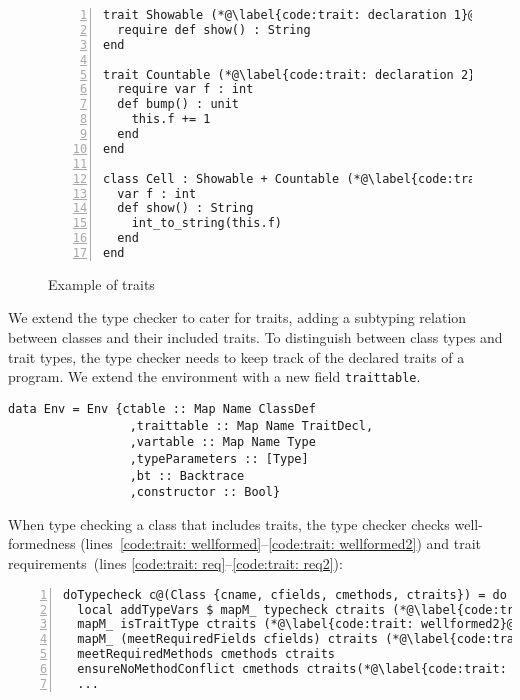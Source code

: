 \documentclass[sigplan,screen]{acmart}
\makeatletter
\newcommand{\ec}[1]{\lstinline[style=encore,breaklines=true,basicstyle=\fontsize{9}{9}\tt]@#1@}
\makeatother
\begin{document}
\begin{figure}[ht]
 \begin{lstlisting}[style=encore,xleftmargin=8ex,numbers=left]
trait Showable (*@\label{code:trait: declaration 1}@*)
  require def show() : String
end

trait Countable (*@\label{code:trait: declaration 2}@*)
  require var f : int
  def bump() : unit
    this.f += 1
  end
end

class Cell : Showable + Countable (*@\label{code:trait: instantiation trait}@*)
  var f : int
  def show() : String
    int_to_string(this.f)
  end
end
 \end{lstlisting}
  \caption{
    \label{fig:traits example} Example of traits}
\end{figure}

We extend the type checker to cater for traits, adding a subtyping
relation between classes and their included traits. To distinguish
between class types and trait types, the type checker needs to
keep track of the declared traits of a program. We extend the
environment with a new field \ec{traittable}.

\begin{minipage}[t]{.50\linewidth}
\begin{lstlisting}[style=encore]
data Env = Env {ctable :: Map Name ClassDef
                 ,traittable :: Map Name TraitDecl,
                 ,vartable :: Map Name Type
                 ,typeParameters :: [Type]
                 ,bt :: Backtrace
                 ,constructor :: Bool}
\end{lstlisting}
\end{minipage}

When type checking a class that includes traits, the type checker
checks well-formedness (lines~\ref{code:trait: wellformed}--\ref{code:trait: wellformed2})
and trait requirements~(lines \ref{code:trait: req}--\ref{code:trait: req2}):

\begin{minipage}[t]{.50\linewidth}
\begin{lstlisting}[style=encore,numbers=left]
doTypecheck c@(Class {cname, cfields, cmethods, ctraits}) = do
  local addTypeVars $ mapM_ typecheck ctraits (*@\label{code:trait: wellformed}@*)
  mapM_ isTraitType ctraits (*@\label{code:trait: wellformed2}@*)
  mapM_ (meetRequiredFields cfields) ctraits (*@\label{code:trait: req}@*)
  meetRequiredMethods cmethods ctraits
  ensureNoMethodConflict cmethods ctraits(*@\label{code:trait: req2}@*)
  ...
\end{lstlisting}
\end{minipage}
\end{document}
